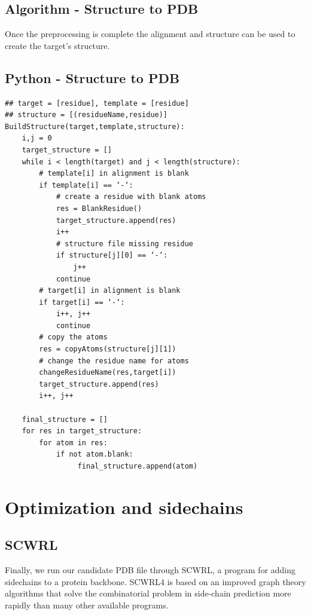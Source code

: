 \documentclass{article}
\begin{document}
\newpage
\subsection{Algorithm - Structure to PDB}

Once the preprocessing is complete the alignment and structure can be used to create the target's structure.

\subsection{Python - Structure to PDB}

\begin{lstlisting}
## target = [residue], template = [residue]
## structure = [(residueName,residue)]
BuildStructure(target,template,structure):
    i,j = 0
    target_structure = []
    while i < length(target) and j < length(structure):
        # template[i] in alignment is blank
        if template[i] == ‘-‘:
            # create a residue with blank atoms
            res = BlankResidue()
            target_structure.append(res)
            i++
            # structure file missing residue
            if structure[j][0] == ‘-‘:
                j++
            continue
        # target[i] in alignment is blank
        if target[i] == ‘-‘:
            i++, j++
            continue
        # copy the atoms
        res = copyAtoms(structure[j][1])
        # change the residue name for atoms
        changeResidueName(res,target[i])
        target_structure.append(res)
        i++, j++
    
    final_structure = []
    for res in target_structure:
        for atom in res:
            if not atom.blank:
                 final_structure.append(atom)
\end{lstlisting}


\section{Optimization and sidechains}

\subsection{SCWRL}

Finally, we run our candidate PDB file through SCWRL, a program for adding sidechains to a protein backbone.  SCWRL4 is based on an improved graph theory algorithms that solve the combinatorial problem in side-chain prediction more rapidly than many other available programs.\\
\end{document}
